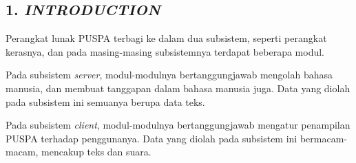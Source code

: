 \subsection*{\textcolor{subsectioncolor}{\textsf{1. \textit{INTRODUCTION}}}}

Perangkat lunak PUSPA terbagi ke dalam dua subsistem, seperti perangkat kerasnya, dan pada masing-masing subsistemnya terdapat beberapa modul.

Pada subsistem \textit{server}, modul-modulnya bertanggungjawab mengolah bahasa manusia, dan membuat tanggapan dalam bahasa manusia juga.
Data yang diolah pada subsistem ini semuanya berupa data teks.

Pada subsistem \textit{client}, modul-modulnya bertanggungjawab mengatur penampilan PUSPA terhadap penggunanya.
Data yang diolah pada subsistem ini bermacam-macam, mencakup teks dan suara.
